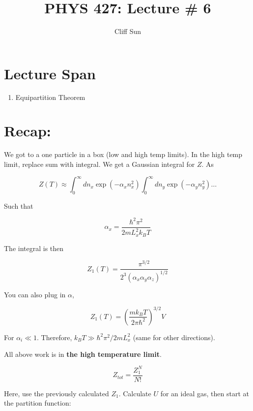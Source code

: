 \documentclass{article}
\title{PHYS 427: Lecture \# 6}
\author{Cliff Sun}
\newtheorem{one minute paper}[theorem]{One Minute Paper}
\begin{document}
\maketitle

\section*{Lecture Span}
\begin{enumerate}
    \item Equipartition Theorem
\end{enumerate}

\section*{Recap:}

We got to a one particle in a box (low and high temp limits). In the high temp limit, replace sum with integral. We get a Gaussian integral for $Z$. As 

\begin{equation}
    Z(T) \approx \int_{0}^{\infty}dn_x \exp(- \alpha_x n_x^2)\int_{0}^{\infty}dn_y \exp(- \alpha_y n_y^2)\dots
\end{equation}

Such that 

\begin{equation}
    \alpha_x = \frac{\hbar^2 \pi^2}{2mL_x^2 k_B T}
\end{equation}

The integral is then 

\begin{equation}
    Z_1(T) = \frac{\pi^{3/2}}{2^3 (\alpha_x \alpha_y \alpha_z)^{1/2}}
\end{equation}

You can also plug in $\alpha$, 

\begin{equation}
    Z_1(T) = \left( \frac{m k_B T}{2\pi\hbar^2} \right)^{3/2}V
\end{equation}

For $\alpha_i \ll 1$. Therefore, $k_B T \gg \hbar^2 \pi^2/2mL_x^2$ (same for other directions). 

All above work is in \textbf{the high temperature limit}. 

\begin{equation}
    Z_{tot} = \frac{Z_1^N}{N!}
\end{equation}

Here, use the previously calculated $Z_1$. Calculate $U$ for an ideal gas, then start at the partition function:
\end{document}
